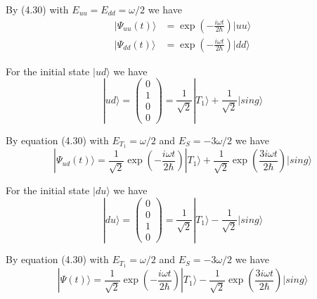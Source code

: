 \documentclass[12pt]{article}
\begin{document}
By (4.30) with $E_{uu}=E_{dd}=\omega/2$ we have
\begin{align*}
|\Psi_{uu}(t)\rangle&=\exp\left(-\frac{i\omega t}{2\hbar}\right)|uu\rangle
\\
|\Psi_{dd}(t)\rangle&=\exp\left(-\frac{i\omega t}{2\hbar}\right)|dd\rangle
\end{align*}

For the initial state $|ud\rangle$ we have
\begin{equation*}
|ud\rangle=\begin{pmatrix}0\\1\\0\\0\end{pmatrix}
=\frac{1}{\sqrt2}|T_1\rangle+\frac{1}{\sqrt2}|sing\rangle
\end{equation*}

By equation (4.30) with $E_{T_1}=\omega/2$ and $E_S=-3\omega/2$ we have
\begin{equation*}
|\Psi_{ud}(t)\rangle=\frac{1}{\sqrt2}\exp\left(-\frac{i\omega t}{2\hbar}\right)|T_1\rangle
+\frac{1}{\sqrt2}\exp\left(\frac{3i\omega t}{2\hbar}\right)|sing\rangle
\end{equation*}

For the initial state $|du\rangle$ we have
\begin{equation*}
|du\rangle=\begin{pmatrix}0\\0\\1\\0\end{pmatrix}
=\frac{1}{\sqrt2}|T_1\rangle-\frac{1}{\sqrt2}|sing\rangle
\end{equation*}

By equation (4.30) with $E_{T_1}=\omega/2$ and $E_S=-3\omega/2$ we have
\begin{equation*}
|\Psi(t)\rangle=\frac{1}{\sqrt2}\exp\left(-\frac{i\omega t}{2\hbar}\right)|T_1\rangle
-\frac{1}{\sqrt2}\exp\left(\frac{3i\omega t}{2\hbar}\right)|sing\rangle
\end{equation*}
\end{document}
